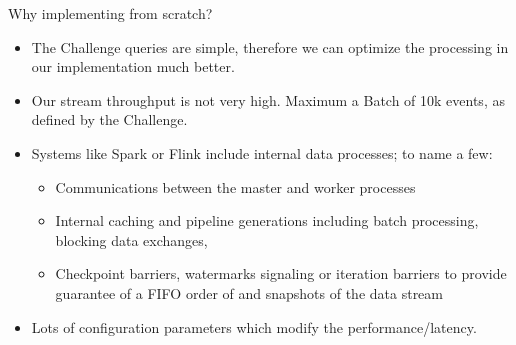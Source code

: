 \documentclass[9pt]{beamer}
\begin{document}
\begin{frame}[fragile]{Why implementing from scratch? }


    \begin{itemize}
            
        \item The Challenge queries are simple, therefore we can optimize the processing in our implementation much better. 
        \item Our stream throughput is not very high. Maximum a Batch of 10k events, as defined by the Challenge. 
        

        \item Systems like Spark or Flink include internal data processes; to name a few: 
        
        \begin{itemize}
            \item Communications between the master and worker processes
            \item Internal caching and pipeline generations including batch processing, blocking data exchanges,
            \item Checkpoint barriers, watermarks signaling or iteration barriers to provide guarantee of a FIFO order of and 
            snapshots of the data stream
   
        \end{itemize}
         
     
    
        \item Lots of configuration parameters which modify the performance/latency. 
        

\end{itemize}
\end{frame}
\end{document}
